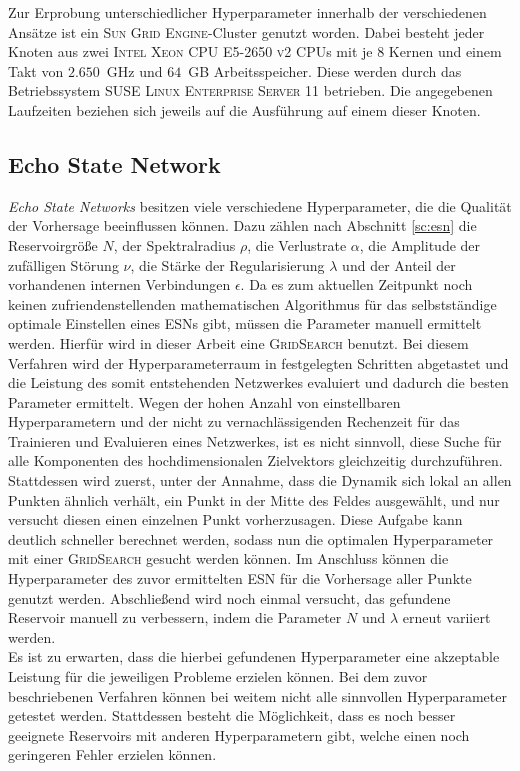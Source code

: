 Zur Erprobung unterschiedlicher Hyperparameter innerhalb der verschiedenen Ansätze ist ein \textsc{Sun Grid Engine}-Cluster genutzt worden. Dabei besteht jeder Knoten aus zwei \textsc{Intel Xeon CPU E5-2650 v2} CPUs mit je $8$ Kernen und einem Takt von $2.650$~GHz und $64$~GB Arbeitsspeicher. Diese werden durch das Betriebssystem \textsc{SUSE Linux Enterprise Server 11} betrieben. Die angegebenen Laufzeiten beziehen sich jeweils auf die Ausführung auf einem dieser Knoten. 


\FloatBarrier
\subsection{Echo State Network}
\label{sec:exp_general_esn}
\textit{Echo State Networks} besitzen viele verschiedene Hyperparameter, die die Qualität der Vorhersage beeinflussen können. Dazu zählen nach Abschnitt \ref{sc:esn} die Reservoirgröße $N$, der Spektralradius $\rho$, die Verlustrate $\alpha$, die Amplitude der zufälligen Störung $\nu$, die Stärke der Regularisierung $\lambda$ und der Anteil der vorhandenen internen Verbindungen $\epsilon$. Da es zum aktuellen Zeitpunkt noch keinen zufriendenstellenden mathematischen Algorithmus für das selbstständige optimale Einstellen eines \textsc{ESN}s gibt, müssen die Parameter manuell ermittelt werden. Hierfür wird in dieser Arbeit eine \textsc{GridSearch} benutzt. Bei diesem Verfahren wird der Hyperparameterraum in festgelegten Schritten abgetastet und die Leistung des somit entstehenden Netzwerkes evaluiert und dadurch die besten Parameter ermittelt. Wegen der hohen Anzahl von einstellbaren Hyperparametern und der nicht zu vernachlässigenden Rechenzeit für das Trainieren und Evaluieren eines Netzwerkes, ist es nicht sinnvoll, diese Suche für alle Komponenten des hochdimensionalen Zielvektors gleichzeitig durchzuführen. Stattdessen wird zuerst, unter der Annahme, dass die Dynamik sich lokal an allen Punkten ähnlich verhält, ein Punkt in der Mitte des Feldes ausgewählt, und nur versucht diesen einen einzelnen Punkt vorherzusagen. Diese Aufgabe kann deutlich schneller berechnet werden, sodass nun die optimalen Hyperparameter mit einer \textsc{GridSearch} gesucht werden können. Im Anschluss können die Hyperparameter des  zuvor ermittelten \textsc{ESN} für die Vorhersage aller Punkte genutzt werden. Abschließend wird noch einmal versucht, das gefundene Reservoir manuell zu verbessern, indem die Parameter $N$ und $\lambda$ erneut variiert werden.\\
Es ist zu erwarten, dass die hierbei gefundenen Hyperparameter eine akzeptable Leistung für die jeweiligen Probleme erzielen können. Bei dem zuvor beschriebenen Verfahren können bei weitem nicht alle sinnvollen Hyperparameter getestet werden. Stattdessen besteht die Möglichkeit, dass es noch besser geeignete Reservoirs mit anderen Hyperparametern gibt, welche einen noch geringeren Fehler erzielen können.\\

